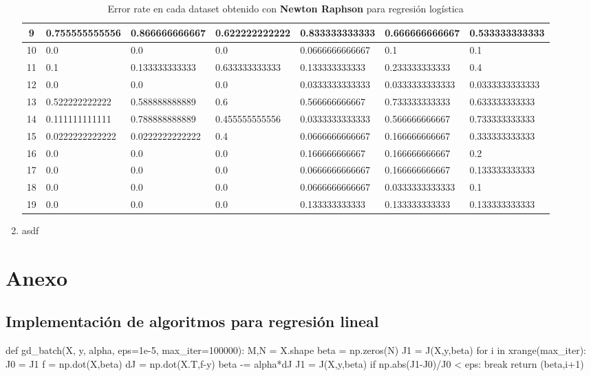 \documentclass[spanish, fleqn]{article}
\begin{document}
\begin{enumerate}
\begin{table}[!htbp]
\begin{tabular}{|c|l|l|l|l|l|l|}
9  & 0.755555555556 & 0.866666666667 & 0.622222222222 & 0.833333333333 & 0.666666666667 & 0.533333333333 \\ \hline
10 & 0.0 & 0.0 & 0.0 & 0.0666666666667 & 0.1 & 0.1 \\ \hline
11 & 0.1 & 0.133333333333 & 0.633333333333 & 0.133333333333 & 0.233333333333 & 0.4 \\ \hline
12 & 0.0 & 0.0 & 0.0 & 0.0333333333333 & 0.0333333333333 & 0.0333333333333 \\ \hline
13 & 0.522222222222 & 0.588888888889 & 0.6 & 0.566666666667 & 0.733333333333 & 0.633333333333 \\ \hline
14 & 0.111111111111 & 0.788888888889 & 0.455555555556 & 0.0333333333333 & 0.566666666667 & 0.733333333333 \\ \hline
15 & 0.0222222222222 & 0.0222222222222 & 0.4 & 0.0666666666667 & 0.166666666667 & 0.333333333333 \\ \hline
16 & 0.0 & 0.0 & 0.0 & 0.166666666667 & 0.166666666667 & 0.2  \\ \hline
17 & 0.0 & 0.0 & 0.0 & 0.0666666666667 & 0.166666666667 & 0.133333333333 \\ \hline
18 & 0.0 & 0.0 & 0.0 & 0.0666666666667 & 0.0333333333333 & 0.1 \\ \hline
19 & 0.0 & 0.0 & 0.0 & 0.133333333333 & 0.133333333333 & 0.133333333333\\ \hline
\end{tabular}
\caption{Error rate en cada dataset obtenido con \textbf{Newton Raphson} para regresión logística}
\label{my-label}
\end{table}

 \item asdf
\end{enumerate}

\newpage
\section*{Anexo}

\subsection*{Implementación de algoritmos para regresión lineal}

\begin{python}
def gd_batch(X, y, alpha, eps=1e-5, max_iter=100000):
    M,N = X.shape
    beta = np.zeros(N)
    J1 = J(X,y,beta)
    for i in xrange(max_iter):
        J0 = J1
        f = np.dot(X,beta)
        dJ = np.dot(X.T,f-y)
        beta -= alpha*dJ
        J1 = J(X,y,beta)
        if np.abs(J1-J0)/J0 < eps:
            break
    return (beta,i+1)
\end{python}
\end{document}
